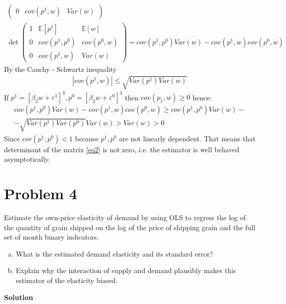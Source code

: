 \documentclass[a4paper]{article}
\newcommand{\expect}{\mathbb{E}}
\begin{document}
\begin{enumerate}[(a)]
\begin{align}
\begin{pmatrix}
	0 & cov(p^1, w) & Var(w)
	\end{pmatrix}\\
	\det \begin{pmatrix}
	1 & \expect[p^1] & \expect[w]\\
	0 & cov(p^1, p^0) & cov(p^0, w)\\
	0 & cov(p^1, w) & Var(w)
	\end{pmatrix} = cov(p^1, p^0)Var(w) - cov(p^1, w)cov(p^0, w)\nonumber
	\end{align}
	By the Cauchy - Schwartz inequality
	\begin{align*}
	|cov(p^1, w)| \le \sqrt{Var(p^1)Var(w)}
	\end{align*}
	If $p^1 = [\beta_2 w + \varepsilon^1]^3, p^0 = [\beta_2 w + \varepsilon^0]^3$ then $cov(p_1, w) \ge 0$ hence:
	\begin{align*}
	cov(p^1, p^0)Var(w) - cov(p^1, w)cov(p^0, w) \ge cov(p^1, p^0)Var(w) - \\
	-\sqrt{Var(p^1)Var(p^0)}Var(w) > Var(w) > 0
	\end{align*}
	Since $cor(p^1, p^0) < 1$ because $p^1, p^0$ are not linearly dependent. That means that determinant of the matrix \eqref{eq2} is not zero, i.e. the estimator is well behaved asymptotically.	
\end{enumerate}
\section*{Problem 4}
Estimate the own-price elasticity of demand by using OLS to regress the log of the quantity
of grain shipped on the log of the price of shipping grain and the full set of month binary
indicators.
\begin{enumerate}[(a)]
\item What is the estimated demand elasticity and its standard error?
\item Explain why the interaction of supply and demand plausibly makes this estimator of
the elasticity biased.
\end{enumerate}


\textbf{Solution}
\end{document}
